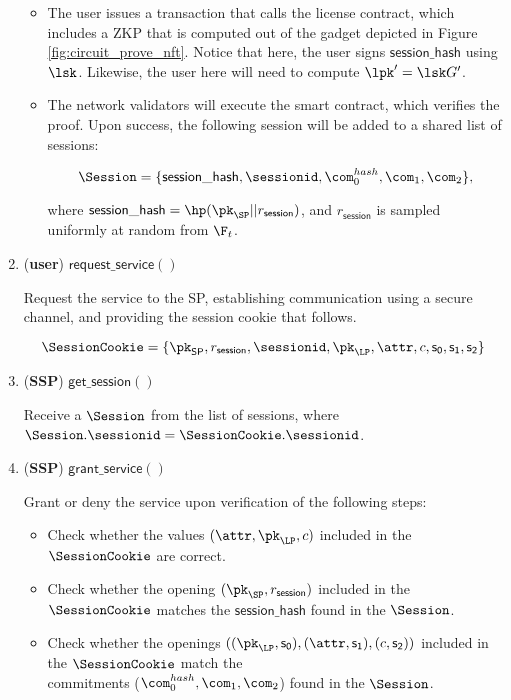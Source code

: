\begin{enumerate}
	
	\begin{itemize}
		\item The user issues a transaction that calls the license contract, which includes a ZKP that is computed out of the gadget depicted in Figure \ref{fig:circuit_prove_nft}. Notice that here, the user signs $\mathsf{session\_hash}$ using $\lsk$. Likewise, the user here will need to compute $\lpk' = \lsk G'$.
		\item The network validators will execute the smart contract, which verifies the proof. Upon success, the following session will be added to a shared list of sessions:
		
		$$\Session = \{\mathsf{session\_hash}, \sessionid, \com_0^{hash}, \com_1, \com_2\},$$
		
		where $\mathsf{session\_hash} = \hp(\pk_{\SP} || r_\mathsf{session})$, and $r_\mathsf{session}$ is sampled uniformly at random from $\F_t$.
		
		
	\end{itemize}
	
\item (\textbf{user}) $\mathsf{request\_service()}$

Request the service to the SP, establishing communication using a secure channel, and providing the session cookie that follows.
	
	$$\SessionCookie = \{\pk_{\mathsf{SP}}, r_\mathsf{session}, \sessionid, \pk_{\LP}, \attr, c, \mathsf{s_0}, \mathsf{s_1}, \mathsf{s_2}\}$$
	
\item (\textbf{SSP}) $\mathsf{get\_session()}$

Receive a $\Session$ from the list of sessions, where $\Session.\sessionid = \SessionCookie.\sessionid$.
	
\item (\textbf{SSP}) $\mathsf{grant\_service()}$

Grant or deny the service upon verification of the following steps:
	
	\begin{itemize}
		\item Check whether the values $(\attr, \pk_{\LP}, c)$ included in the $\SessionCookie$ are correct.
		\item Check whether the opening $(\pk_{\SP}, r_\mathsf{session})$ included in the $\SessionCookie$ matches the $\mathsf{session\_hash}$ found in the $\Session$.
		\item Check whether the openings $((\pk_{\LP}, \mathsf{s_0}), (\attr, \mathsf{s_1}), (c, \mathsf{s_2}))$ included in the $\SessionCookie$ match the\\
			  commitments ($\com_0^{hash}, \com_1, \com_2$) found in the $\Session$.
	\end{itemize}


\end{enumerate}
